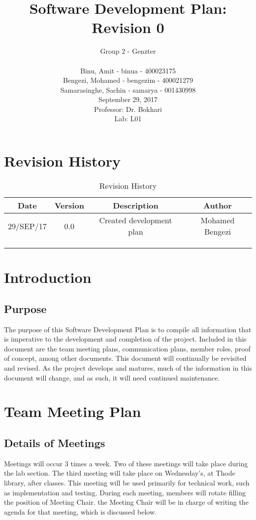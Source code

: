 \documentclass[12pt]{article}
\title{Software Development Plan: Revision 0}
\author{Group 2 - Genzter \\
		\\ Binu, Amit - binua - 400023175
		\\ Bengezi, Mohamed - bengezim - 400021279
		\\ Samarasinghe, Sachin - samarya - 001430998
		\\ September 29, 2017
		\\Professor: Dr. Bokhari
		\\ Lab: L01}
\begin{document}
\maketitle

\newpage

{\centering
  \tableofcontents\par
}

\newpage
\section{Revision History}
\begin{table}[h]
\begin{center}
\begin{tabular}{ | c | c | c | c | }
\hline
 Date & Version & Description & Author \\ 
\hline
 29/SEP/17 & 0.0 & Created development plan & Mohamed Bengezi \\  
\hline
  & & & \\
\hline
 & & & \\
\hline 
 & & & \\ 
\hline 
\end{tabular}
\end{center}
\caption{Revision History}
\end{table}

\newpage
\section{Introduction}
\subsection{Purpose}
\tab The purpose of this Software Development Plan is to compile all information that is imperative to the development and completion of the project. Included in this document are the team meeting plans, communication plans, member roles, proof of concept, among other documents. This document will continually be revisited and revised. As the project develops and matures, much of the information in this document will change, and as such, it will need continued maintenance.

\newpage

\section{Team Meeting Plan}
\subsection{Details of Meetings}
Meetings will occur 3 times a week. Two of these meetings will take place during the lab section. The third meeting will take place on Wednesday's, at Thode library, after classes. This meeting will be used primarily for technical work, such as implementation and testing.  During each meeting, members will rotate filling the position of Meeting Chair. the Meeting Chair will be in charge of writing the agenda for that meeting, which is discussed below. 
\end{document}
